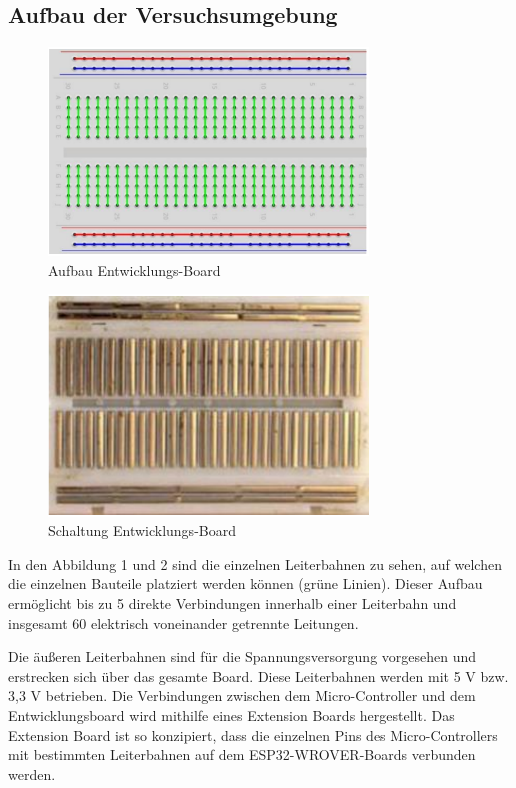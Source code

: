 \documentclass[conference,compsoc,final,a4paper]{IEEEtran}
\begin{document}
\subsection{Aufbau der Versuchsumgebung}
\begin{figure}[h]
\centering
\includegraphics[width=8.5cm]{../images/board.png}
\caption{Aufbau Entwicklungs-Board}
\label{Elektrik:DevBoard}
\end{figure}
\begin{figure}[h]
\centering
\includegraphics[width=8.5cm]{../images/board2.png}
\caption{Schaltung Entwicklungs-Board}
\label{Elektrik:DevBoardInternal}
\end{figure}

In den Abbildung 1 und 2 sind die einzelnen Leiterbahnen zu sehen, auf welchen die einzelnen Bauteile platziert werden können (grüne Linien). 
Dieser Aufbau ermöglicht bis zu 5 direkte Verbindungen innerhalb einer Leiterbahn und insgesamt 60 elektrisch voneinander getrennte Leitungen.

Die äußeren Leiterbahnen sind für die Spannungsversorgung vorgesehen und erstrecken sich über das gesamte Board. Diese Leiterbahnen werden mit 5 V bzw. 3,3 V betrieben.
Die Verbindungen zwischen dem Micro-Controller und dem Entwicklungsboard wird mithilfe eines Extension Boards hergestellt. Das Extension Board ist so konzipiert, 
dass die einzelnen Pins des Micro-Controllers mit bestimmten Leiterbahnen auf dem ESP32-WROVER-Boards verbunden werden.
\end{document}
